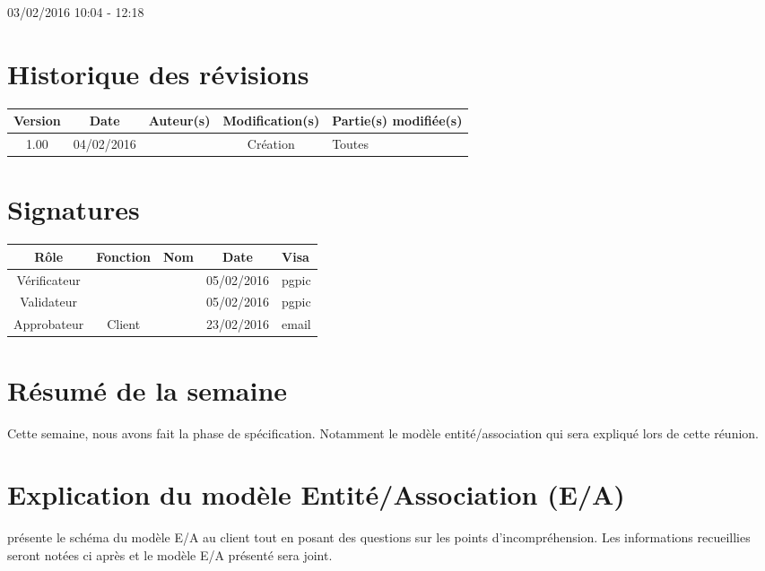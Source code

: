 \documentclass [a4paper] {article}
\begin{document}
03/02/2016			 				%
\hfill   
\hfill 	 10:04 - 12:18 				%


\section*{Historique des révisions}
\begin{center}
			\begin{tabular}{| c | c | c | c | p{4cm} |}
				\hline
				\rowcolor{Gray}
				Version & Date & Auteur(s) & Modification(s) & Partie(s) modifiée(s)		 \\
				\hline
				1.00 & 04/02/2016 & \Pierre & Création & Toutes \\
		\hline		
			\end{tabular}
		\end{center}

\section*{Signatures}

		\begin{center}
			\begin{tabular}{| c | c | c | c | p{4cm} |}
				\hline
				\rowcolor{Gray}
				Rôle & Fonction & Nom & Date & Visa		 \\
				\hline
				Vérificateur & \RQA & \Kafui & 05/02/2016 & pgpic \\[30pt]
				\hline
				Validateur & \CP & \Sergi & 05/02/2016 & pgpic \\[30pt]	
				\hline
				Approbateur & Client & \nomClient & 23/02/2016 & email \\[30pt]	
				\hline
			\end{tabular}
		\end{center}


\section{Résumé de la semaine}
Cette semaine, nous avons fait la phase de spécification. Notamment le modèle entité/association qui sera expliqué lors de cette réunion.


\section{Explication du modèle Entité/Association (E/A)}
\Julie{} présente le schéma du modèle E/A au client tout en posant des questions sur les points d'incompréhension. Les informations recueillies seront notées ci après et le modèle E/A présenté sera joint.
\\
\end{document}
